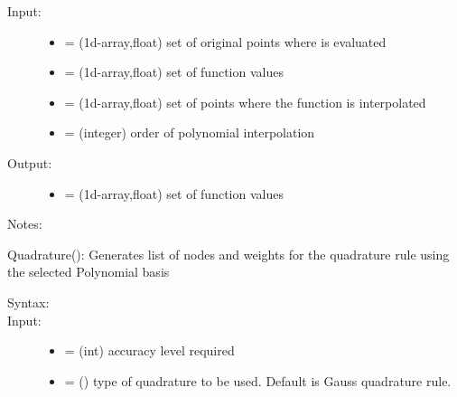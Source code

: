 \documentclass[letterpaper,10pt,english]{sphinxmanual}
\begin{document}
\begin{fulllineitems}
\begin{fulllineitems}
\begin{description}
\item[{Input:}] \leavevmode\begin{itemize}
\item {} 
 = (1d-array,float) set of  original points where  is evaluated

\item {} 
 = (1d-array,float) set of  function values

\item {} 
 = (1d-array,float) set of  points where the function is interpolated

\item {} 
 = (integer) order of polynomial interpolation

\end{itemize}

\item[{Output:}] \leavevmode\begin{itemize}
\item {} 
 = (1d-array,float) set of  function values

\end{itemize}

\end{description}

Notes:

\end{fulllineitems}


\begin{fulllineitems}
\label{index:SpectralToolbox.Spectral1D.Poly1D.Quadrature}
Quadrature(): Generates list of nodes and weights for the  quadrature rule using the selected Polynomial basis
\begin{description}
\item[{Syntax:}] \leavevmode
{}

\item[{Input:}] \leavevmode\begin{itemize}
\item {} 
 = (int) accuracy level required

\item {} 
 = () type of quadrature to be used. Default is Gauss quadrature rule.


\end{itemize}
\end{description}
\end{fulllineitems}
\end{fulllineitems}
\end{document}
